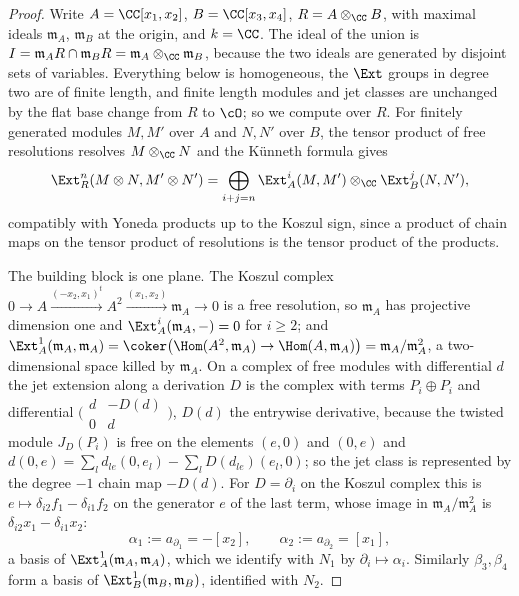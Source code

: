 \begin{proof}
Write $A=\CC[x_{1},x_{2}]$, $B=\CC[x_{3},x_{4}]$, $R=A\otimes_{\CC}B$, with
maximal ideals $\mathfrak m_{A}$, $\mathfrak m_{B}$ at the origin, and
$k=\CC$. The ideal of the union is $I=\mathfrak m_{A}R\cap\mathfrak m_{B}R
=\mathfrak m_{A}\otimes_{\CC}\mathfrak m_{B}$, because the two ideals are
generated by disjoint sets of variables. Everything below is homogeneous, the
$\Ext$ groups in degree two are of finite length, and finite length modules
and jet classes are unchanged by the flat base change from $R$ to $\cO$; so we
compute over $R$. For finitely generated modules $M,M'$ over $A$ and $N,N'$
over $B$, the tensor product of free resolutions resolves $M\otimes_{\CC}N$
and the K\"unneth formula gives
\begin{equation}\label{eq:kunnethext}
  \Ext^{n}_{R}(M\otimes N,M'\otimes N')
  =\bigoplus_{i+j=n}\Ext^{i}_{A}(M,M')\otimes_{\CC}\Ext^{j}_{B}(N,N'),
\end{equation}
compatibly with Yoneda products up to the Koszul sign, since a product of
chain maps on the tensor product of resolutions is the tensor product of the
products.

The building block is one plane. The Koszul complex
$0\to A\xrightarrow{(-x_{2},x_{1})^{t}}A^{2}\xrightarrow{(x_{1},x_{2})}\mathfrak m_{A}\to0$
is a free resolution, so $\mathfrak m_{A}$ has projective dimension one and
$\Ext^{i}_{A}(\mathfrak m_{A},-)=0$ for $i\ge2$; and
$\Ext^{1}_{A}(\mathfrak m_{A},\mathfrak m_{A})=\coker\bigl(\Hom(A^{2},\mathfrak m_{A})
\to\Hom(A,\mathfrak m_{A})\bigr)=\mathfrak m_{A}/\mathfrak m_{A}^{2}$, a
two-dimensional space killed by $\mathfrak m_{A}$. On a complex of free
modules with differential $d$ the jet extension along a derivation $D$ is the
complex with terms $P_{i}\oplus P_{i}$ and differential
$\bigl(\begin{smallmatrix}d&-D(d)\\0&d\end{smallmatrix}\bigr)$, $D(d)$ the
entrywise derivative, because the twisted module $J_{D}(P_{i})$ is free on the
elements $(e,0)$ and $(0,e)$ and $d(0,e)=\sum_{l}d_{le}(0,e_{l})-\sum_{l}D(d_{le})(e_{l},0)$;
so the jet class is represented by the degree $-1$ chain map $-D(d)$. For
$D=\partial_{i}$ on the Koszul complex this is $e\mapsto\delta_{i2}f_{1}-\delta_{i1}f_{2}$
on the generator $e$ of the last term, whose image in
$\mathfrak m_{A}/\mathfrak m_{A}^{2}$ is $\delta_{i2}x_{1}-\delta_{i1}x_{2}$:
\[
  \alpha_{1}:=a_{\partial_{1}}=-[x_{2}],\qquad
  \alpha_{2}:=a_{\partial_{2}}=[x_{1}],
\]
a basis of $\Ext^{1}_{A}(\mathfrak m_{A},\mathfrak m_{A})$, which we identify
with $N_{1}$ by $\partial_{i}\mapsto\alpha_{i}$. Similarly $\beta_{3},\beta_{4}$
form a basis of $\Ext^{1}_{B}(\mathfrak m_{B},\mathfrak m_{B})$, identified
with $N_{2}$.


\end{proof}
